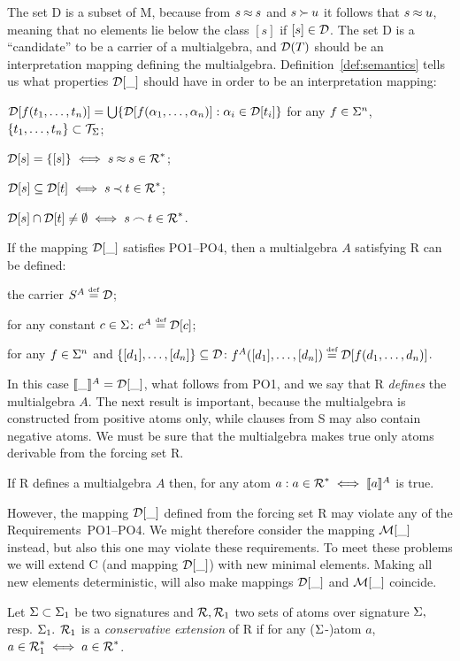 The set \C D is a subset of \C M, because from \(s\Eq s\) and \(s\Cont u\)
it follows that \(s\Eq u\), meaning that no elements lie below the class \([s]\) if
\([s]\in\C D\). The set \C D is a ``candidate'' to be a carrier of a
multialgebra, and \(\C D(T)\) should be an interpretation mapping defining the
multialgebra.  Definition~\ref {def:semantics} tells us what properties
$\C D[\_]$ should have in order to be an interpretation mapping:
\begin{description}\MyLPar
\item [PO1.] \(\C D [f(\List tn,)] =
\bigcup\{\C D [f(\List\alpha n,)]:\alpha_i\in \C D [t_i]\}\) 
for any \(f\in \Funcs^n\), \(\{\List tn,\}\subset
\GTerms\);
\item [PO2.] \(\C D [s]=\{[s]\}\iff s\Eq s\in\C R^\ast\);
\item [PO3.] \(\C D [s]\subseteq \C D [t] \iff s\Incl t\in\C R^\ast\);
\item [PO4.] \(\C D [s]\cap \C D [t]\not=\es \iff s\Int t\in\C R^\ast\).
\end{description}
\noindent If the mapping \(\C D[\_]\) satisfies PO1--PO4, then a multialgebra $A$
satisfying \C R can be defined:
\begin{description}\MyLPar
\item[MA1.] the carrier \(S^A\Def \C D\);
\item[MA2.] for any constant \(c\in\Funcs\): \(c^A\Def \C D[c]\);
\item[MA3.] for any \(f\in\Funcs^n\) and
\(\{[d_1] ,\ldots, [d_n]\}\subseteq\C D\):
\(f^A([d_1] ,\ldots, [d_n])\Def \C D[f(\List dn,)]\).
\end{description}
In this case \(\Interpret\_=\C D[\_]\), what follows from PO1, and we say that
\C R {\em defines} the multialgebra $A$. The next result is important, because
the multialgebra is constructed from positive atoms only, while clauses from
\C S may also contain negative atoms. We must be sure that the multialgebra
makes true only atoms derivable from the forcing set \C R.
\begin{LEMMA} \label{le:MA-exact}
If \C R defines a multialgebra $A$ then, for any atom \(a :
a\in\C R^\ast \iff \Interpret a\) is true.
\end{LEMMA}
However, the mapping $\C D[\_]$ defined from the forcing set \C R may violate any
of the Requirements~PO1--PO4. We might therefore consider the mapping \(\C M[\_]\)
instead, but also this one may violate these requirements.
To meet these problems we will extend
 \C C (and mapping \(\C D[\_]\)) with new minimal elements. Making
 all new elements deterministic, will also make mappings \(\C D[\_]\) and
\(\C M[\_]\) coincide.
\begin{DEFINITION} \label{def:conservative-extension}
Let \(\Funcs\subset\Funcs_1\) be two signatures and \(\C R, \C R_1\) two sets of
atoms over signature $\Funcs,$ resp. \(\Funcs_1.\)
\(\C R_1\) is a {\em conservative extension} of \C R if for any 
($\Funcs$-)atom \(a\), \(a\in\C R_1^\ast\iff a\in\C R^\ast\).
\end{DEFINITION} 

